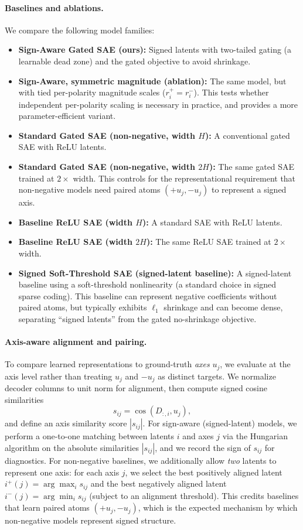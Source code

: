 \documentclass{article}
\begin{document}
\paragraph{Baselines and ablations.}
We compare the following model families:
\begin{itemize}
    \item \textbf{Sign-Aware Gated SAE (ours):} Signed latents with two-tailed gating (a learnable dead zone) and the gated
    objective to avoid shrinkage.
    \item \textbf{Sign-Aware, symmetric magnitude (ablation):} The same model, but with tied per-polarity magnitude scales
    ($r_i^+=r_i^-$). This tests whether independent per-polarity scaling is necessary in practice, and provides a more
    parameter-efficient variant.
    \item \textbf{Standard Gated SAE (non-negative, width $H$):} A conventional gated SAE with ReLU latents.
    \item \textbf{Standard Gated SAE (non-negative, width $2H$):} The same gated SAE trained at $2\times$ width. This
    controls for the representational requirement that non-negative models need paired atoms $(+u_j,-u_j)$ to represent a
    signed axis.
    \item \textbf{Baseline ReLU SAE (width $H$):} A standard SAE with ReLU latents.
    \item \textbf{Baseline ReLU SAE (width $2H$):} The same ReLU SAE trained at $2\times$ width.
    \item \textbf{Signed Soft-Threshold SAE (signed-latent baseline):} A signed-latent baseline using a soft-threshold
    nonlinearity (a standard choice in signed sparse coding). This baseline can represent negative coefficients without paired
    atoms, but typically exhibits $\ell_1$ shrinkage and can become dense, separating ``signed latents'' from the gated
    no-shrinkage objective.
\end{itemize}

\paragraph{Axis-aware alignment and pairing.}
To compare learned representations to ground-truth \emph{axes} $u_j$, we evaluate at the axis level rather than treating
$u_j$ and $-u_j$ as distinct targets. We normalize decoder columns to unit norm for alignment, then compute signed cosine
similarities
\[
    s_{ij} = \cos(D_{:,i}, u_j),
\]
and define an axis similarity score $|s_{ij}|$. For sign-aware (signed-latent) models, we perform a one-to-one matching
between latents $i$ and axes $j$ via the Hungarian algorithm on the absolute similarities $|s_{ij}|$, and we record the sign
of $s_{ij}$ for diagnostics.
For non-negative baselines, we additionally allow \emph{two} latents to represent one axis: for each axis $j$, we select the
best positively aligned latent $i^+(j)=\arg\max_i s_{ij}$ and the best negatively aligned latent $i^-(j)=\arg\min_i s_{ij}$
(subject to an alignment threshold). This credits baselines that learn paired atoms $(+u_j,-u_j)$, which is the expected
mechanism by which non-negative models represent signed structure.
\end{document}
